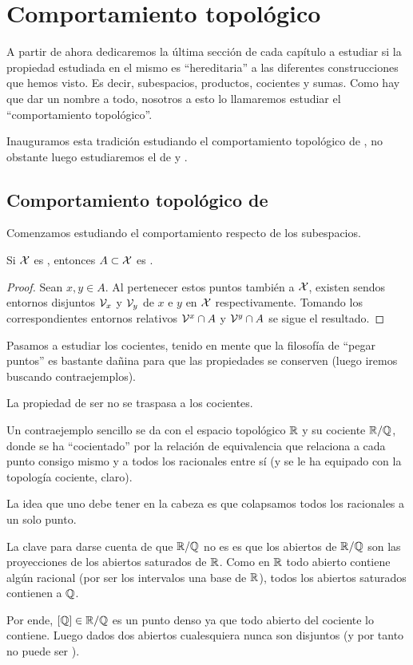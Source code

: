 \section{Comportamiento topológico} 
A partir de ahora dedicaremos la última sección de cada capítulo a estudiar si la propiedad estudiada en el mismo es ``hereditaria'' a las diferentes construcciones que hemos visto. Es decir, subespacios, productos, cocientes y sumas. Como hay que dar un nombre a todo, nosotros a esto lo llamaremos estudiar el ``comportamiento topológico''.

Inauguramos esta tradición estudiando el comportamiento topológico de \hausdorff, no obstante luego estudiaremos el de \frechet y \kolmogorov.
\subsection{Comportamiento topológico de \hausdorff}
Comenzamos estudiando el comportamiento respecto de los subespacios.
\begin{lem}[Subespacios]
	Si $\mathcal{X}$ es \hausdorff, entonces $A\subset\mathcal{X}$ es \hausdorff.
\end{lem}
\begin{proof}
	 Sean $x,y\in A$. Al pertenecer estos puntos también a $\mathcal{X}$, existen sendos entornos disjuntos $\mathcal{V}_x$ y $\mathcal{V}_y$ de $x$ e $y$ en $\mathcal{X}$ respectivamente. Tomando los correspondientes entornos relativos $\mathcal{V}^x \cap A$ y $\mathcal{V}^y \cap A$ se sigue el resultado.
\end{proof}
Pasamos a estudiar los cocientes, tenido en mente que la filosofía de ``pegar puntos'' es bastante dañina para que las propiedades se conserven (luego iremos buscando contraejemplos).
\begin{obs}[Cocientes]
	La propiedad de ser \hausdorff no se traspasa a los cocientes.
	
	Un contraejemplo sencillo se da con el espacio topológico $\mathbb{R}$ y su cociente $\mathbb{R}/\mathbb{Q}$, donde se ha ``cocientado'' por la relación de equivalencia que relaciona a cada punto consigo mismo y a todos los racionales entre sí (y se le ha equipado con la topología cociente, claro).
	
	La idea que uno debe tener en la cabeza es que colapsamos todos los racionales a un solo punto.
	
	La clave para darse cuenta de que $\mathbb{R}/\mathbb{Q}$ no es \hausdorff es que los abiertos de $\mathbb{R}/\mathbb{Q}$ son las proyecciones de los abiertos saturados de $\mathbb{R}$. Como en $\mathbb{R}$ todo abierto contiene algún racional (por ser los intervalos una base de $\mathbb{R}$), todos los abiertos saturados contienen a $\mathbb{Q}$.
	
	Por ende, $\left [ \mathbb{Q} \right ]\in\mathbb{R}/\mathbb{Q}$ es un punto denso ya que todo abierto del cociente lo contiene. Luego dados dos abiertos cualesquiera nunca son disjuntos (y por tanto no puede ser \hausdorff).
\end{obs}
